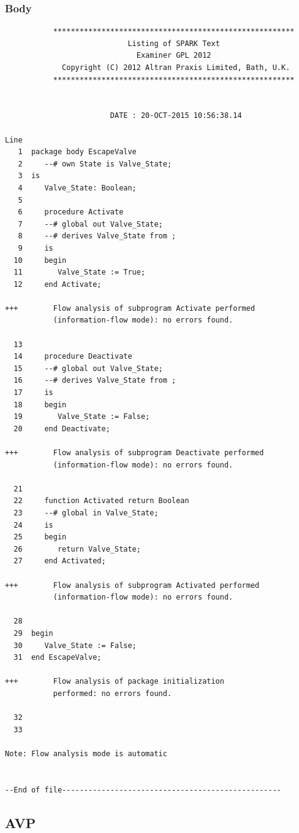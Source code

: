 \documentclass[a4paper, titlepage]{article}
\begin{document}
\subsubsection{Body}
{\tiny
\begin{lstlisting}
           *******************************************************
                            Listing of SPARK Text
                              Examiner GPL 2012
             Copyright (C) 2012 Altran Praxis Limited, Bath, U.K.
           *******************************************************


                        DATE : 20-OCT-2015 10:56:38.14

Line
   1  package body EscapeValve
   2     --# own State is Valve_State;
   3  is
   4     Valve_State: Boolean;
   5  
   6     procedure Activate
   7     --# global out Valve_State;
   8     --# derives Valve_State from ;
   9     is
  10     begin
  11        Valve_State := True;
  12     end Activate;

+++        Flow analysis of subprogram Activate performed 
           (information-flow mode): no errors found.

  13  
  14     procedure Deactivate
  15     --# global out Valve_State;
  16     --# derives Valve_State from ;
  17     is
  18     begin
  19        Valve_State := False;
  20     end Deactivate;

+++        Flow analysis of subprogram Deactivate performed 
           (information-flow mode): no errors found.

  21  
  22     function Activated return Boolean
  23     --# global in Valve_State;
  24     is
  25     begin
  26        return Valve_State;
  27     end Activated;

+++        Flow analysis of subprogram Activated performed 
           (information-flow mode): no errors found.

  28  
  29  begin
  30     Valve_State := False;
  31  end EscapeValve;

+++        Flow analysis of package initialization 
           performed: no errors found.

  32  
  33  

Note: Flow analysis mode is automatic


--End of file--------------------------------------------------

\end{lstlisting}
}
\subsection{AVP}
\end{document}
